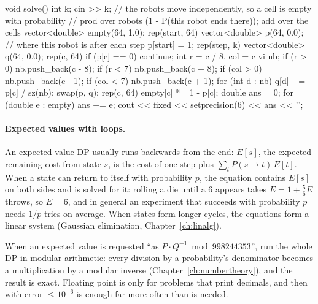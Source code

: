 \begin{code}
void solve() {
    int k;
    cin >> k;
    // the robots move independently, so a cell is empty with probability
    // prod over robots (1 - P(this robot ends there)); add over the cells
    vector<double> empty(64, 1.0);
    rep(start, 64) {
        vector<double> p(64, 0.0);  // where this robot is after each step
        p[start] = 1;
        rep(step, k) {
            vector<double> q(64, 0.0);
            rep(c, 64) {
                if (p[c] == 0) continue;
                int r = c / 8, col = c %
                vi nb;
                if (r > 0) nb.push_back(c - 8);
                if (r < 7) nb.push_back(c + 8);
                if (col > 0) nb.push_back(c - 1);
                if (col < 7) nb.push_back(c + 1);
                for (int d : nb) q[d] += p[c] / sz(nb);
            }
            swap(p, q);
        }
        rep(c, 64) empty[c] *= 1 - p[c];
    }
    double ans = 0;
    for (double e : empty) ans += e;
    cout << fixed << setprecision(6) << ans << '\n';
}
\end{code}

\paragraph{Expected values with loops.} An expected-value DP usually runs backwards from the end: $E[s]$, the expected remaining cost
from state $s$, is the cost of one step plus $\sum_t P(s \to t)\, E[t]$. When a state can return to itself with probability $p$, the
equation contains $E[s]$ on both sides and is solved for it: rolling a die until a 6 appears takes $E = 1 + \frac56 E$ throws, so $E =
6$, and in general an experiment that succeeds with probability $p$ needs $1/p$ tries on average. When states form longer cycles,
the equations form a linear system (Gaussian elimination, Chapter~\ref{ch:linalg}).

\begin{trick}
When an expected value is requested ``as $P \cdot Q^{-1} \bmod 998244353$'', run the whole DP in modular arithmetic: every division by
a probability's denominator becomes a multiplication by a modular inverse (Chapter~\ref{ch:numbertheory}), and the result is exact.
Floating point is only for problems that print decimals, and then  with error $\le 10^{-6}$ is enough far more often than
 is needed.
\end{trick}

